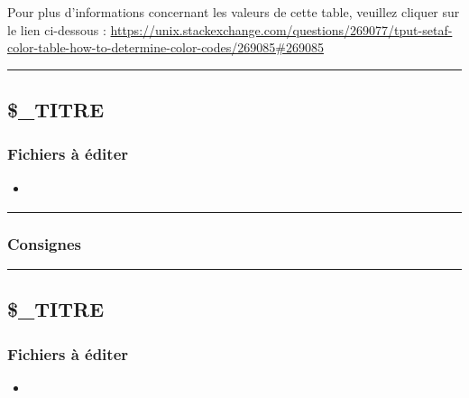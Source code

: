 \documentclass[a4paper,10pt]{article}
\begin{document}
Pour plus d'informations concernant les valeurs de cette table, veuillez cliquer sur le lien ci-dessous :\linebreak
\url{https://unix.stackexchange.com/questions/269077/tput-setaf-color-table-how-to-determine-color-codes/269085#269085}



\color{green}\par\noindent\rule{\textwidth}{0.4pt}\color{white}

\color{green}
\subsection{\$\_TITRE}\color{white}

\color{blue}
\subsubsection{Fichiers à éditer}\color{white}
\begin{itemize}
    \item \textbf{\color{lime}}
\end{itemize}



\color{blue}\par\noindent\rule{\textwidth}{0.4pt}\color{white}

\color{blue}
\subsubsection{Consignes}\color{white}



\color{green}\par\noindent\rule{\textwidth}{0.4pt}\color{white}

\color{green}
\subsection{\$\_TITRE}\color{white}

\color{blue}
\subsubsection{Fichiers à éditer}\color{white}
\begin{itemize}
    \item \textbf{\color{lime}}
\end{itemize}
\end{document}
